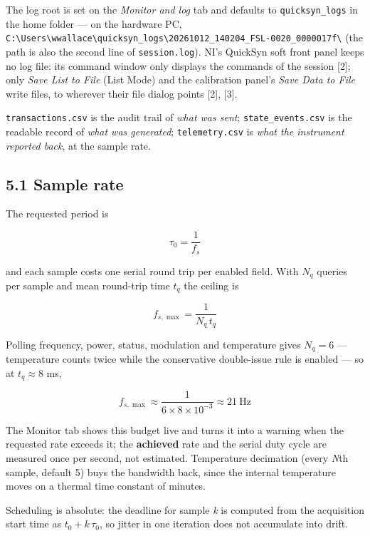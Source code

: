 \documentclass[
\directlua{luaotfload.add_fallback("qsfallback", {"DejaVu Sans:mode=harf;", "DejaVu Sans Mono:mode=harf;", "DejaVu Math TeX Gyre:mode=harf;"})}
  10pt,
  letterpaper,
]{article}
\begin{document}
The log root is set on the \emph{Monitor and log} tab and defaults to
\texttt{quicksyn\_logs} in the home folder --- on the hardware PC,
\texttt{C:\textbackslash{}Users\textbackslash{}wwallace\textbackslash{}quicksyn\_logs\textbackslash{}20261012\_140204\_FSL-0020\_0000017f\textbackslash{}}
(the path is also the second line of \texttt{session.log}). NI's
QuickSyn soft front panel keeps no log file: its command window only
displays the commands of the session {[}2{]}; only \emph{Save List to
File} (List Mode) and the calibration panel's \emph{Save Data to File}
write files, to wherever their file dialog points {[}2{]}, {[}3{]}.

\texttt{transactions.csv} is the audit trail of \emph{what was sent};
\texttt{state\_events.csv} is the readable record of \emph{what was
generated}; \texttt{telemetry.csv} is \emph{what the instrument reported
back}, at the sample rate.

\hypertarget{sample-rate}{%
\subsection{5.1 Sample rate}\label{sample-rate}}

The requested period is

\[ \tau_0 = \frac{1}{f_s} \]

and each sample costs one serial round trip per enabled field. With
\(N_q\) queries per sample and mean round-trip time \(t_q\) the ceiling
is

\[ f_{s,\max} = \frac{1}{N_q\,t_q} \]

Polling frequency, power, status, modulation and temperature gives
\(N_q = 6\) --- temperature counts twice while the conservative
double-issue rule is enabled --- so at \(t_q \approx 8\) ms,

\[ f_{s,\max} \approx \frac{1}{6 \times 8\times10^{-3}} \approx 21\ \text{Hz} \]

The Monitor tab shows this budget live and turns it into a warning when
the requested rate exceeds it; the \textbf{achieved} rate and the serial
duty cycle are measured once per second, not estimated. Temperature
decimation (every \emph{N}th sample, default 5) buys the bandwidth back,
since the internal temperature moves on a thermal time constant of
minutes.

Scheduling is absolute: the deadline for sample \emph{k} is computed
from the acquisition start time as \(t_0 + k\,\tau_0\), so jitter in one
iteration does not accumulate into drift.
\end{document}
